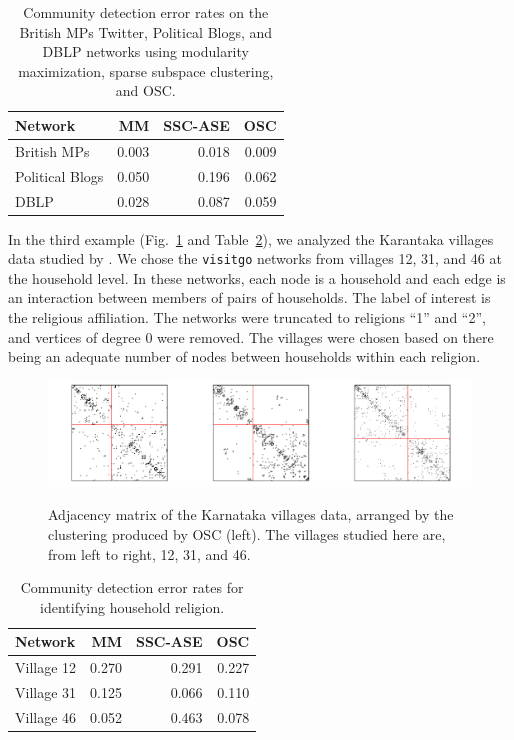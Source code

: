 \documentclass[12pt]{article}
\begin{document}
\begin{table}
\centering
\begin{tabular}[t]{l|r|r|r}
\hline
Network & MM & SSC-ASE & OSC\\
\hline
British MPs & 0.003 & 0.018 & 0.009\\
\hline
Political Blogs & 0.050 & 0.196 & 0.062\\
\hline
DBLP & 0.028 & 0.087 & 0.059\\
\hline
\end{tabular}
\caption{\label{tab:unnamed-chunk-6}Community detection error rates on the British MPs Twitter, Political Blogs, and DBLP networks using modularity maximization, sparse subspace clustering, and OSC.}
\end{table}

In the third example (Fig.~\ref{fig:households-figure} and 
Table~\ref{tab:households-table}), 
we analyzed the Karantaka villages data studied by
\citet{DVN/U3BIHX_2013}. We chose the \texttt{visitgo}
networks from villages 12, 31, and 46 at the household level. 
In these networks, each node is a household and each edge is 
an interaction between members of pairs of households. 
The label of interest is the religious affiliation. 
The networks were truncated to religions ``1'' and ``2'', 
and vertices of degree 0 were removed. 
The villages were chosen based on there being an adequate number of nodes 
between households within each religion. 

\begin{figure}[tp]
{\centering \includegraphics{summary_files/figure-latex/unnamed-chunk-7-1}
}
\caption{Adjacency matrix of the Karnataka villages data, arranged by the clustering produced by OSC (left). The villages studied here are, from left to right, 12, 31, and 46.}\label{fig:households-figure}
\end{figure}

\begin{table}
\centering
\begin{tabular}[t]{l|r|r|r}
\hline
Network & MM & SSC-ASE & OSC\\
\hline
Village 12 & 0.270 & 0.291 & 0.227\\
\hline
Village 31 & 0.125 & 0.066 & 0.110\\
\hline
Village 46 & 0.052 & 0.463 & 0.078\\
\hline
\end{tabular}
\caption{\label{tab:households-table}Community detection error rates for identifying household religion.}
\end{table}
\end{document}
